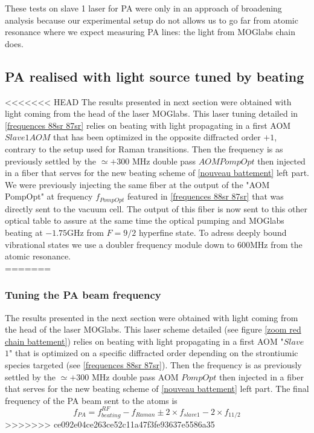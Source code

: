 These tests on slave 1 laser for PA were only in an approach of broadening analysis because our experimental setup do not allows us to go far from
atomic resonance where we expect measuring PA lines: the light from MOGlabs chain does.

\subsection{PA realised with light source tuned by beating }
<<<<<<< HEAD
The results presented in next section were obtained with light coming from the head of the laser MOGlabs. This laser tuning detailed in \ref{frequences 88sr 87sr} 
relies on beating with light propagating in a first AOM $Slave 1 AOM$ that has been optimized in the opposite diffracted order $+1$, contrary to the setup used 
for Raman transitions. Then the frequency is as previously settled by the $\simeq +300$ MHz double pass $AOM PompOpt$ then injected in a fiber that serves for the 
new beating scheme of \ref{nouveau battement} left part.\\
We were previously injecting the same fiber at the output of the "AOM PompOpt" at frequency $f_{PompOpt}$
featured in \ref{frequences 88sr 87sr} that was directly sent to the vacuum cell. The output 
of this fiber is now sent to this other optical table to assure at the same time the optical pumping and 
MOGlabs beating at $-1.75$GHz from $F=9/2$ hyperfine state. 
To adress deeply bound vibrational states we use a doubler frequency module down to $600$MHz
from the atomic resonance.\\
=======
\subsubsection{Tuning the PA beam frequency}
The results presented in the next section were obtained with light coming from the head of the laser MOGlabs. This laser scheme detailed (see figure \ref{zoom red chain battement})
relies on beating with light propagating in a first AOM "$Slave$ $1$" that is optimized on a specific diffracted order depending on the strontiumic species targeted 
(see \ref{frequences 88sr 87sr}). Then the frequency is as previously settled by the $\simeq +300$ MHz double pass AOM $PompOpt$ then injected in a fiber that serves for the 
new beating scheme of \ref{nouveau battement} left part. The final frequency of the PA beam sent to the atoms is
\begin{equation}
    f_{PA} = f^{RF}_{beating} - f_{Raman} \pm 2\times f_{slave 1} - 2\times f_{11/2}
\end{equation}
>>>>>>> ce092e04ce263ce52c11a47f3fe93637e5586a35

